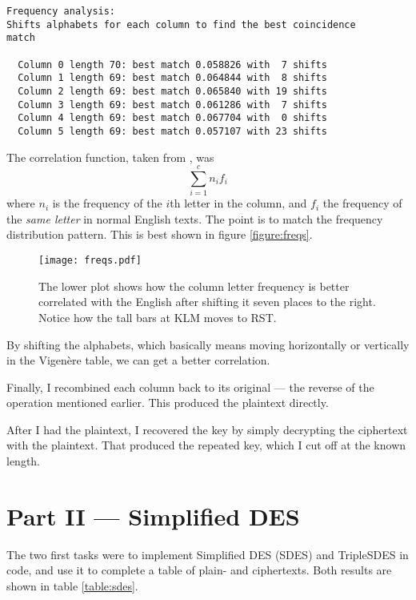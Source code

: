 \documentclass[a4paper,english,12pt]{article}
\begin{document}
\begin{verbatim}
Frequency analysis:
Shifts alphabets for each column to find the best coincidence
match

  Column 0 length 70: best match 0.058826 with  7 shifts
  Column 1 length 69: best match 0.064844 with  8 shifts
  Column 2 length 69: best match 0.065840 with 19 shifts
  Column 3 length 69: best match 0.061286 with  7 shifts
  Column 4 length 69: best match 0.067704 with  0 shifts
  Column 5 length 69: best match 0.057107 with 23 shifts
\end{verbatim}

The correlation function, taken from \cite{wiki:coincidence}, was
\[
  \sum_{i=1}^{c} n_i f_i
\]
where $n_i$ is the frequency of the $i$th letter in the column, and $f_i$ the
frequency of the \textit{same letter} in normal English texts. The point is to
match the frequency distribution pattern. This is best shown in figure
\vref{figure:freqs}.

\begin{figure}
  \centering
  \texttt{[image: freqs.pdf]}
  \caption{The lower plot shows how the column letter frequency is better
  correlated with the English after shifting it seven places to the right.
  Notice how the tall bars at KLM moves to RST.}
  \label{figure:freqs}
\end{figure}

By shifting the alphabets, which basically means moving horizontally or
vertically in the Vigenère table, we can get a better correlation.

Finally, I recombined each column back to its original --- the reverse of the
operation mentioned earlier. This produced the plaintext directly.

After I had the plaintext, I recovered the key by simply decrypting the
ciphertext with the plaintext. That produced the repeated key, which I cut off
at the known length.

\section{Part II --- Simplified DES}

The two first tasks were to implement Simplified DES (SDES)
\cite{stallings2006cryptography} and TripleSDES in code, and use it to complete
a table of plain- and ciphertexts. Both results are shown in table
\vref{table:sdes}.
\end{document}
